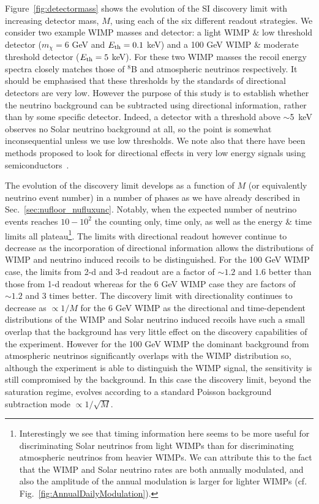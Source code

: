 Figure~\ref{fig:detectormass} shows the evolution of the SI discovery limit with increasing detector mass, $M$, using each of the six different readout strategies. We consider two example WIMP masses and detector: a light WIMP \&  low threshold detector ($m_{\chi} = 6$ GeV and $E_{\rm th} = 0.1$ keV) and a 100 GeV WIMP \&  moderate threshold detector ($E_{\rm th} = 5 $ keV). For these two WIMP masses the recoil energy spectra closely matches those of $^8$B and atmospheric neutrinos respectively. It should be emphasised that these thresholds by the standards of directional detectors are very low. However the purpose of this study is to establish whether the neutrino background can be subtracted using directional information, rather than by some specific detector. Indeed, a detector with a threshold above $\sim$5~keV observes no Solar neutrino background at all, so the point is somewhat inconsequential unless we use low thresholds. We note also that there have been methods proposed to look for directional effects in very low energy signals using semiconductors~\cite{Kadribasic:2017obi}.

The evolution of the discovery limit develops as a function of $M$ (or equivalently neutrino event number) in a number of phases as we have already described in Sec.~\ref{sec:nufloor_nufluxunc}. Notably, when the expected number of neutrino events reaches $10-10^{2}$ the counting only, time only, as well as the energy \& time limits all plateau\footnote{Interestingly we see that timing information here seems to be more useful for discriminating Solar neutrinos from light WIMPs than for discriminating atmospheric neutrinos from heavier WIMPs. We can attribute this to the fact that the WIMP and Solar neutrino rates are both annually modulated, and also the amplitude of the annual modulation is larger for lighter WIMPs (cf. Fig.~\ref{fig:AnnualDailyModulation}).}. The limits with directional readout however continue to decrease as the incorporation of directional information allows the distributions of WIMP and neutrino induced recoils to be distinguished. For the 100 GeV WIMP case, the limits from 2-d and 3-d readout are a factor of $\sim 1.2$ and $1.6$ better than those from 1-d readout whereas for the 6 GeV WIMP case they are factors of $\sim 1.2$ and $3$ times better. The discovery limit with directionality continues to decrease as $\propto 1/M$ for the 6 GeV WIMP as the directional and time-dependent distributions of the WIMP and Solar neutrino induced recoils have such a small overlap that the background has very little effect on the discovery capabilities of the experiment. However for the 100 GeV WIMP the dominant background from atmospheric neutrinos significantly overlaps with the WIMP distribution so, although the experiment is able to distinguish the WIMP signal, the sensitivity is still compromised by the background. In this case the discovery limit, beyond the saturation regime, evolves according to a standard Poisson background subtraction mode $\propto 1/\sqrt{M}$.

